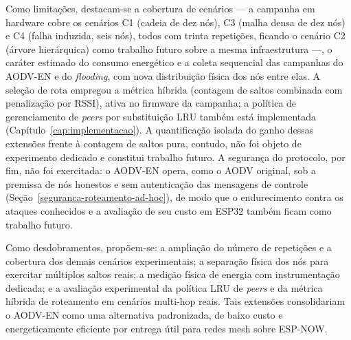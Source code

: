 Como limitações, destacam-se a cobertura de cenários --- a campanha em hardware cobre os
cenários C1 (cadeia de dez nós), C3 (malha densa de dez nós) e C4 (falha induzida, seis
nós), todos com trinta repetições, ficando o cenário C2 (árvore hierárquica) como trabalho
futuro sobre a mesma infraestrutura ---, o caráter estimado do consumo energético e a coleta sequencial das
campanhas do AODV-EN e do \emph{flooding}, com nova distribuição física dos nós entre
elas. A seleção de rota empregou a métrica híbrida (contagem de saltos combinada
com penalização por RSSI), ativa no firmware da campanha; a política de gerenciamento
de \emph{peers} por substituição LRU também está implementada
(Capítulo~\ref{cap:implementacao}). A quantificação isolada do ganho dessas extensões
frente à contagem de saltos pura, contudo, não foi objeto de experimento dedicado e
constitui trabalho futuro.
A segurança do protocolo, por fim, não foi exercitada: o AODV-EN opera, como o AODV
original, sob a premissa de nós honestos e sem autenticação das mensagens de controle
(Seção~\ref{seguranca-roteamento-ad-hoc}), de modo que o endurecimento contra os ataques
conhecidos e a avaliação de seu custo em ESP32 também ficam como trabalho futuro.

Como desdobramentos, propõem-se: a ampliação do número de repetições e a cobertura dos
demais cenários experimentais; a separação física dos nós para exercitar múltiplos
saltos reais; a medição física de energia com instrumentação dedicada; e a
avaliação experimental da política LRU de \emph{peers} e da métrica híbrida de
roteamento em cenários multi-hop reais. Tais extensões consolidariam o AODV-EN como uma alternativa padronizada,
de baixo custo e energeticamente eficiente por entrega útil para redes mesh sobre ESP-NOW.
